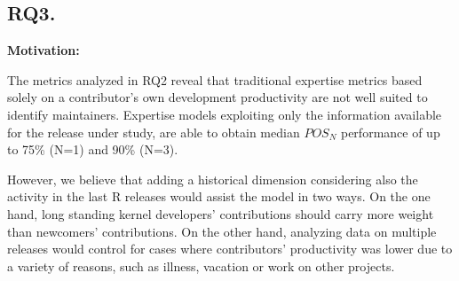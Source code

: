 


\subsection*{RQ3. \rqthree}
\label{sec:rq3.-does-historical}

{\bf Motivation:} 

The metrics analyzed in RQ2 reveal that traditional expertise metrics based solely on a contributor's own development productivity are not well suited to identify maintainers. Expertise models exploiting only the information available for the release under study, are able to obtain median $POS_N$ performance of up to 75\% (N=1) and 90\% (N=3).%

However, %
we believe that adding a historical dimension considering also the activity in the last R releases would assist the model in two ways. On the one hand, long standing kernel developers' contributions should carry more weight than newcomers' contributions. On the other hand, analyzing data on multiple releases would control for cases where contributors' productivity was lower due to a variety of reasons, such as illness, vacation or work on other projects.





